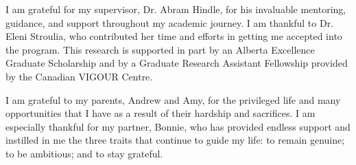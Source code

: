 \documentclass[\main/thesis.tex]{subfiles}
\begin{document}
\begin{acknowledgements} 

I am grateful for my supervisor, Dr. Abram Hindle, for his invaluable mentoring, guidance, and support throughout my academic journey.
I am thankful to Dr. Eleni Stroulia, who contributed her time and efforts in getting me accepted into the program.
This research is supported in part by an Alberta Excellence Graduate Scholarship and by a Graduate Research Assistant Fellowship provided by the Canadian VIGOUR Centre.

I am grateful to my parents, Andrew and Amy, for the privileged life and many opportunities that I have as a result of their hardship and sacrifices.
I am especially thankful for my partner, Bonnie, who has provided endless support and instilled in me the three traits that continue to guide my life: to remain genuine; to be ambitious; and to stay grateful.

\end{acknowledgements}
\end{document}
